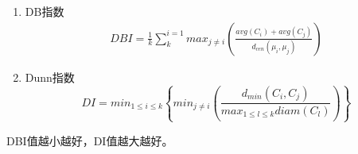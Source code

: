 \documentclass{article}
\begin{document}
	\begin{enumerate}
		\item DB指数
		\begin{eqnarray}
		DBI=\frac{1}{k}\sum_{k}^{i=1}max_{j\neq i}\left ( \frac{avg(C_{i})+avg(C_{j})}{d_{cen}(\mu _{i},\mu _{j})} \right )
		\end{eqnarray}
		\item Dunn指数
		\begin{equation}
		DI=min_{1\leq i\leq k}\left \{ min_{j\neq i}\left ( \frac{d_{min}\left ( C_{i},C_{j} \right )}{max_{1\leq l\leqslant k}diam(C_{l})} \right ) \right \}
		\end{equation}
	\end{enumerate}
	DBI值越小越好，DI值越大越好。
\end{document}
